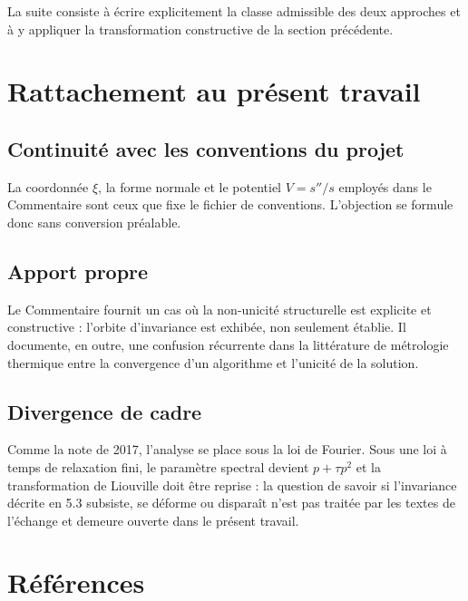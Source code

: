 \documentclass[11pt,a4paper]{article}
\begin{document}
La suite consiste à écrire explicitement la classe admissible des deux approches et
à y appliquer la transformation constructive de la section précédente.

\section{Rattachement au présent travail}

\subsection{Continuité avec les conventions du projet}

La coordonnée $\xi$, la forme normale et le potentiel $V=s''/s$ employés dans le Commentaire sont ceux
que fixe le fichier de conventions. L'objection se formule donc sans conversion préalable.

\subsection{Apport propre}

Le Commentaire fournit un cas où la non-unicité structurelle est explicite et constructive : l'orbite
d'invariance est exhibée, non seulement établie. Il documente, en outre, une confusion récurrente dans
la littérature de métrologie thermique entre la convergence d'un algorithme et l'unicité de la solution.

\subsection{Divergence de cadre}

Comme la note de 2017, l'analyse se place sous la loi de Fourier. Sous une loi à temps de relaxation
fini, le paramètre spectral devient $p+\tau p^{2}$ et la transformation de Liouville doit être reprise :
la question de savoir si l'invariance décrite en 5.3 subsiste, se déforme ou disparaît n'est pas traitée
par les textes de l'échange et demeure ouverte dans le présent travail.

\section{Références}
\end{document}
